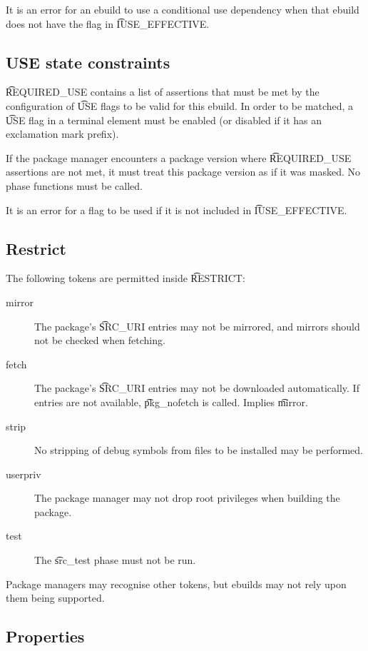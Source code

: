 It is an error for an ebuild to use a conditional use dependency when that ebuild does not have the
flag in \t{IUSE_EFFECTIVE}.

\subsection{USE state constraints}
\label{sec:required-use}
\t{REQUIRED_USE} contains a list of assertions that must be met by the configuration of \t{USE}
flags to be valid for this ebuild. In order to be matched, a \t{USE} flag in a terminal element
must be enabled (or disabled if it has an exclamation mark prefix).

If the package manager encounters a package version where \t{REQUIRED_USE} assertions are not met,
it must treat this package version as if it was masked. No phase functions must be called.

It is an error for a flag to be used if it is not included in \t{IUSE_EFFECTIVE}.

\subsection{Restrict}
\label{sec:restrict}

The following tokens are permitted inside \t{RESTRICT}:

\begin{description}
\item[mirror] The package's \t{SRC_URI} entries may not be mirrored, and mirrors should not
    be checked when fetching.
\item[fetch] The package's \t{SRC_URI} entries may not be downloaded automatically. If
    entries are not available, \t{pkg_nofetch} is called. Implies \t{mirror}.
\item[strip] No stripping of debug symbols from files to be installed may be performed.
\item[userpriv] The package manager may not drop root privileges when building the package.
\item[test] The \t{src_test} phase must not be run.
\end{description}

Package managers may recognise other tokens, but ebuilds may not rely upon them being supported.

\subsection{Properties}
\label{sec:properties}

